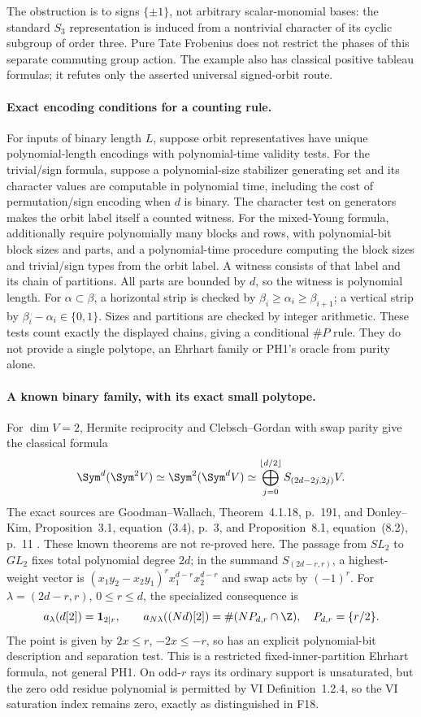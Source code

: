 \documentclass[11pt,a4paper]{article}
\newcommand{\fid}[1]{\textsf{#1}}\newcommand{\gate}[1]{\textsf{#1}}
\theoremstyle{named}\newtheorem{finding}{Finding}[section]
\theoremstyle{definition}\newtheorem{definition}[finding]{Definition}
\theoremstyle{remark}\newtheorem{remark}[finding]{Remark}
\begin{document}
The obstruction is to signs $\{\pm1\}$, not arbitrary scalar-monomial
bases: the standard $S_3$ representation is induced from a nontrivial
character of its cyclic subgroup of order three. Pure Tate Frobenius
does not restrict the phases of this separate commuting group action.
The example also has classical positive tableau formulas; it refutes
only the asserted universal signed-orbit route.

\paragraph{Exact encoding conditions for a counting rule.}
For inputs of binary length $L$, suppose orbit representatives have
unique polynomial-length encodings with polynomial-time validity tests.
For the trivial/sign formula, suppose a polynomial-size stabilizer
generating set and its character values are computable in polynomial
time, including the cost of permutation/sign encoding when $d$ is
binary. The character test on generators makes the orbit label itself
a counted witness. For the mixed-Young formula, additionally require
polynomially many blocks and rows, with polynomial-bit block sizes and
parts, and a polynomial-time procedure computing the block sizes and
trivial/sign types from the orbit label. A witness consists of that label
and its chain of partitions.
All parts are bounded by $d$, so the witness is polynomial length.
For $\alpha\subset\beta$, a horizontal strip is checked by
$\beta_i\ge\alpha_i\ge\beta_{i+1}$; a vertical strip by
$\beta_i-\alpha_i\in\{0,1\}$. Sizes and partitions are checked by
integer arithmetic. These tests count exactly the displayed chains,
giving a conditional \(\#P\) rule. They do not provide a single
polytope, an Ehrhart family or PH1's oracle from purity alone.

\paragraph{A known binary family, with its exact small polytope.}
For $\dim V=2$, Hermite reciprocity and Clebsch--Gordan with swap parity
give the classical formula
\[
 \Sym^d(\Sym^2 V)\simeq\Sym^2(\Sym^dV)
       \simeq\bigoplus_{j=0}^{\lfloor d/2\rfloor}S_{(2d-2j,2j)}V.
\]
The exact sources are Goodman--Wallach, Theorem~4.1.18, p.~191,
and Donley--Kim, Proposition~3.1, equation~(3.4), p.~3, and
Proposition~8.1, equation~(8.2), p.~11 \cite{GW,DK}.
These known theorems are not re-proved here. The passage from $SL_2$
to $GL_2$ fixes total polynomial degree $2d$; in the summand
$S_{(2d-r,r)}$, a highest-weight vector is
$(x_1y_2-x_2y_1)^r x_1^{d-r}x_2^{d-r}$ and swap acts by $(-1)^r$.
For $\lambda=(2d-r,r)$, $0\le r\le d$, the specialized consequence is
\[
 a_\lambda(d[2])=\mathbf1_{2\mid r},\qquad
 a_{N\lambda}((Nd)[2])
 =\#(N P_{d,r}\cap\Z),\quad P_{d,r}=\{r/2\}.
\]
The point is given by $2x\le r$, $-2x\le-r$, so has an explicit
polynomial-bit description and separation test. This is a restricted
fixed-inner-partition Ehrhart formula, not general PH1. On odd-$r$
rays its ordinary support is unsaturated, but the zero odd residue
polynomial is permitted by VI Definition~1.2.4, so the VI saturation
index remains zero, exactly as distinguished in \fid{F18}.
\end{document}
